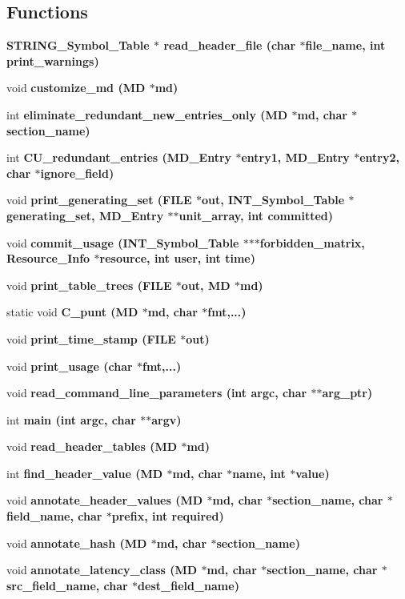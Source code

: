 \subsection*{Functions}
\begin{CompactItemize}
\item 
\bf{STRING\_\-Symbol\_\-Table} $\ast$ \bf{read\_\-header\_\-file} (char $\ast$file\_\-name, int print\_\-warnings)
\item 
void \bf{customize\_\-md} (\bf{MD} $\ast$md)
\item 
int \bf{eliminate\_\-redundant\_\-new\_\-entries\_\-only} (\bf{MD} $\ast$md, char $\ast$section\_\-name)
\item 
int \bf{CU\_\-redundant\_\-entries} (\bf{MD\_\-Entry} $\ast$entry1, \bf{MD\_\-Entry} $\ast$entry2, char $\ast$ignore\_\-field)
\item 
void \bf{print\_\-generating\_\-set} (FILE $\ast$out, \bf{INT\_\-Symbol\_\-Table} $\ast$generating\_\-set, \bf{MD\_\-Entry} $\ast$$\ast$unit\_\-array, int committed)
\item 
void \bf{commit\_\-usage} (\bf{INT\_\-Symbol\_\-Table} $\ast$$\ast$$\ast$forbidden\_\-matrix, \bf{Resource\_\-Info} $\ast$resource, int user, int time)
\item 
void \bf{print\_\-table\_\-trees} (FILE $\ast$out, \bf{MD} $\ast$md)
\item 
static void \bf{C\_\-punt} (\bf{MD} $\ast$md, char $\ast$fmt,...)
\item 
void \bf{print\_\-time\_\-stamp} (FILE $\ast$out)
\item 
void \bf{print\_\-usage} (char $\ast$fmt,...)
\item 
void \bf{read\_\-command\_\-line\_\-parameters} (int argc, char $\ast$$\ast$arg\_\-ptr)
\item 
int \bf{main} (int argc, char $\ast$$\ast$argv)
\item 
void \bf{read\_\-header\_\-tables} (\bf{MD} $\ast$md)
\item 
int \bf{find\_\-header\_\-value} (\bf{MD} $\ast$md, char $\ast$\bf{name}, int $\ast$value)
\item 
void \bf{annotate\_\-header\_\-values} (\bf{MD} $\ast$md, char $\ast$section\_\-name, char $\ast$field\_\-name, char $\ast$prefix, int required)
\item 
void \bf{annotate\_\-hash} (\bf{MD} $\ast$md, char $\ast$section\_\-name)
\item 
void \bf{annotate\_\-latency\_\-class} (\bf{MD} $\ast$md, char $\ast$section\_\-name, char $\ast$src\_\-field\_\-name, char $\ast$dest\_\-field\_\-name)
$$
\end{CompactItemize}
